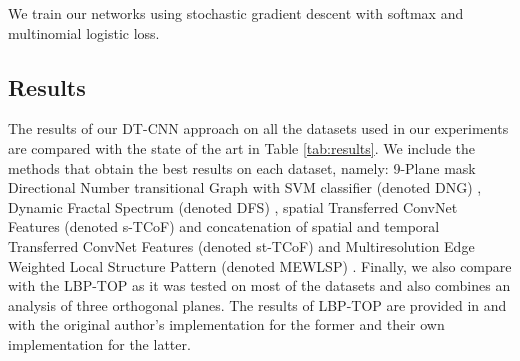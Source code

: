 \documentclass[a4paper,11pt]{article}
\begin{document}
We train our networks using stochastic gradient descent with softmax and multinomial logistic loss.

\subsection{Results}%
\label{subsec:Results}
The results of our DT-CNN approach on all the datasets used in our experiments are compared with the state of the art in Table \ref{tab:results}. We include the methods that obtain the best results on each dataset, namely:
9-Plane mask Directional Number transitional Graph with SVM classifier (denoted DNG) \cite{ramirez2015spatiotemporal}, Dynamic Fractal Spectrum (denoted DFS) \cite{xu2011dynamic},
spatial Transferred ConvNet Features (denoted s-TCoF) and concatenation of spatial and temporal Transferred ConvNet Features (denoted st-TCoF) \cite{qi2016dynamic}
and Multiresolution Edge Weighted Local Structure Pattern (denoted MEWLSP) \cite{tiwari2016dynamic}.
Finally, we also compare with the LBP-TOP \cite{zhao2007dynamic} as it was tested on most of the datasets and also combines an analysis of three orthogonal planes.
The results of LBP-TOP are provided in \cite{norouznezhad2012directional} and \cite{qi2016dynamic} with the original author's implementation \cite{zhao2007dynamic} for the former and their own implementation for the latter.
\begin{table*}[!t]
\caption{Accuracy results (\%) on DT datasets of the proposed DT-CNN approaches and of the state of the art.} \label{tab:results}
\centering
{}
\end{table*}
\end{document}
